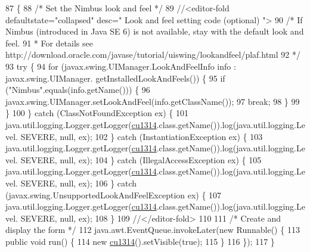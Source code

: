 \begin{DoxyCode}
87                                            \{
88         \textcolor{comment}{/* Set the Nimbus look and feel */}
89         \textcolor{comment}{//<editor-fold defaultstate="collapsed" desc=" Look and feel setting code (optional) ">}
90         \textcolor{comment}{/* If Nimbus (introduced in Java SE 6) is not available, stay with the default look and feel.}
91 \textcolor{comment}{         * For details see http://download.oracle.com/javase/tutorial/uiswing/lookandfeel/plaf.html }
92 \textcolor{comment}{         */}
93         \textcolor{keywordflow}{try} \{
94             \textcolor{keywordflow}{for} (javax.swing.UIManager.LookAndFeelInfo info : javax.swing.UIManager.
      getInstalledLookAndFeels()) \{
95                 \textcolor{keywordflow}{if} (\textcolor{stringliteral}{"Nimbus"}.equals(info.getName())) \{
96                     javax.swing.UIManager.setLookAndFeel(info.getClassName());
97                     \textcolor{keywordflow}{break};
98                 \}
99             \}
100         \} \textcolor{keywordflow}{catch} (ClassNotFoundException ex) \{
101             java.util.logging.Logger.getLogger(\mbox{\hyperlink{classinterfacessoguar_1_1cu1314_a96829fa8e13831c1c9be1e7573fcc7da}{cu1314}}.class.getName()).log(java.util.logging.Level.
      SEVERE, null, ex);
102         \} \textcolor{keywordflow}{catch} (InstantiationException ex) \{
103             java.util.logging.Logger.getLogger(\mbox{\hyperlink{classinterfacessoguar_1_1cu1314_a96829fa8e13831c1c9be1e7573fcc7da}{cu1314}}.class.getName()).log(java.util.logging.Level.
      SEVERE, null, ex);
104         \} \textcolor{keywordflow}{catch} (IllegalAccessException ex) \{
105             java.util.logging.Logger.getLogger(\mbox{\hyperlink{classinterfacessoguar_1_1cu1314_a96829fa8e13831c1c9be1e7573fcc7da}{cu1314}}.class.getName()).log(java.util.logging.Level.
      SEVERE, null, ex);
106         \} \textcolor{keywordflow}{catch} (javax.swing.UnsupportedLookAndFeelException ex) \{
107             java.util.logging.Logger.getLogger(\mbox{\hyperlink{classinterfacessoguar_1_1cu1314_a96829fa8e13831c1c9be1e7573fcc7da}{cu1314}}.class.getName()).log(java.util.logging.Level.
      SEVERE, null, ex);
108         \}
109         \textcolor{comment}{//</editor-fold>}
110 
111         \textcolor{comment}{/* Create and display the form */}
112         java.awt.EventQueue.invokeLater(\textcolor{keyword}{new} Runnable() \{
113             \textcolor{keyword}{public} \textcolor{keywordtype}{void} run() \{
114                 \textcolor{keyword}{new} \mbox{\hyperlink{classinterfacessoguar_1_1cu1314_a96829fa8e13831c1c9be1e7573fcc7da}{cu1314}}().setVisible(\textcolor{keyword}{true});
115             \}
116         \});
117     \}
\end{DoxyCode}


